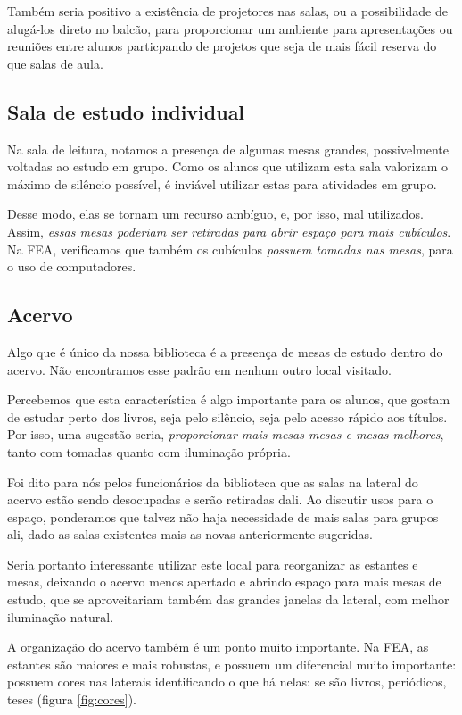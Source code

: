 \documentclass[titlepage]{article}
\begin{document}
Também seria positivo a existência de projetores nas salas, ou a possibilidade 
de alugá-los direto no balcão, para proporcionar um ambiente para apresentações
ou reuniões entre alunos particpando de projetos que seja de mais fácil reserva
do que salas de aula.

\subsection{Sala de estudo individual}
Na sala de leitura, notamos a presença de algumas mesas grandes, possivelmente 
voltadas ao estudo em grupo. Como os alunos que utilizam esta sala valorizam o 
máximo de silêncio possível, é inviável utilizar estas para atividades em grupo.

Desse modo, elas se tornam um recurso ambíguo, e, por isso, mal utilizados. 
Assim, \emph{essas mesas poderiam ser retiradas para abrir espaço para mais 
cubículos}.  Na FEA, verificamos que também os cubículos \emph{possuem tomadas 
nas mesas}, para o uso de computadores.

\subsection{Acervo}
Algo que é único da nossa biblioteca é a presença de mesas de estudo dentro 
do acervo. Não encontramos esse padrão em nenhum outro local visitado. 

Percebemos que esta característica é algo importante para os alunos, que gostam 
de estudar perto dos livros, seja pelo silêncio, seja pelo acesso rápido aos
títulos. Por isso, uma sugestão seria, \emph{proporcionar mais mesas mesas e 
mesas melhores}, tanto com tomadas quanto com iluminação própria.

Foi dito para nós pelos funcionários da biblioteca que as salas na lateral do 
acervo estão sendo desocupadas e serão retiradas dali. Ao discutir usos para o 
espaço, ponderamos que talvez não haja necessidade de mais salas para grupos 
ali, dado as salas existentes mais as novas anteriormente sugeridas.

Seria portanto interessante utilizar este local para reorganizar as estantes e 
mesas, deixando o acervo menos apertado e abrindo espaço para mais mesas de 
estudo, que se aproveitariam também das grandes janelas da lateral, com melhor
iluminação natural.

A organização do acervo também é um ponto muito importante. Na FEA, as 
estantes são maiores e mais robustas, e possuem um diferencial muito 
importante: possuem cores nas laterais identificando o que há nelas: se são 
livros, periódicos, teses (figura \ref{fig:cores}). 
\end{document}
